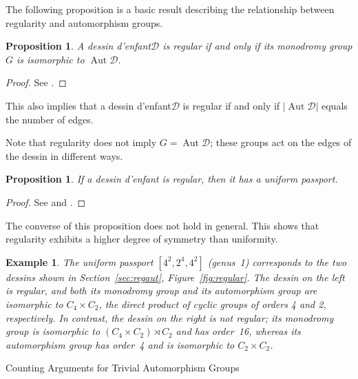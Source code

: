 \documentclass[12pt,reqno]{amsart}
\makeatletter
\newif\if@noindentafterheading
\renewcommand\section{\@startsection{section}{1}{\z@}%
  {-3.5ex \@plus -1ex \@minus -.2ex}%
  {2.6ex \@plus .2ex}%
  {\normalfont\large\bfseries}%
}
\let\orig@section\section
\renewcommand\section{%
  \@ifstar{\section@star}{\section@nostar}%
}
\newcommand\section@nostar{%
  \@ifnextchar[{\section@opt}{\section@noopt}%
}
\newcommand\section@opt[2][]{%
  \global\@noindentafterheadingtrue
  \orig@section[#1]{#2}%
  \global\@noindentafterheadingfalse
}
\newcommand\section@noopt[1]{%
  \global\@noindentafterheadingtrue
  \orig@section{#1}%
  \global\@noindentafterheadingfalse
}
\newcommand\section@star[1]{%
  \global\@noindentafterheadingtrue
  \orig@section*{#1}%
  \global\@noindentafterheadingfalse
}
\newcommand{\msD}{\mathscr{D}}
\DeclareMathOperator{\Aut}{Aut}							%
\theoremstyle{mythmstyle}
\newtheorem{prop}[lemma]{Proposition}
\theoremstyle{mydefstyle}
\newtheorem{exa}[lemma]{Example}
\newcommand{\figref}[1]{Figure~\ref{#1}}
\newcommand{\dde}{dessin d'enfant\xspace}
\newcommand{\AD}{\Aut{\msD}}
\numberwithin{equation}{section}
\makeatother
\begin{document}
The following proposition is a basic result describing the relationship between regularity and automorphism groups.

\begin{prop}
\label{prop:regaut}
A \dde $\msD$ is regular if and only if its monodromy group $G$ is isomorphic to $\AD$.
\end{prop}

\begin{proof}
See \cite[Theorem~2.1]{Jones16}.
\end{proof}

This also implies that a \dde $\msD$ is regular if and only if $\lvert \AD \rvert$ equals the number of edges.

Note that regularity does not imply $G = \Aut \msD$;
these groups act on the edges of the dessin in different ways.

\begin{prop}
\label{prop:reguni}
If a \dde is regular, then it has a uniform passport.
\end{prop}

\begin{proof}
See \cite[Proposition~4.42]{Girondo12} and \cite[Proposition~2.10]{Ohnishi26}.
\end{proof}

The converse of this proposition does not hold in general.
This shows that regularity exhibits a higher degree of symmetry than uniformity.

\begin{exa}
The uniform passport $[4^{2}, 2^{4}, 4^{2}]$ (genus~1) corresponds to the two dessins shown in
Section~\ref{sec:regaut}, \figref{fig:regular}.
The dessin on the left is regular, and both its monodromy group and its automorphism group are
isomorphic to $C_{4} \times C_{2}$, the direct product of cyclic groups of orders 4 and 2, respectively.
In contrast, the dessin on the right is not regular; its monodromy group is isomorphic to $(C_{4} \times C_{2}) \rtimes C_{2}$
and has order~16, whereas its automorphism group has order~4 and is isomorphic to $C_{2} \times C_{2}$.
\end{exa}

\section{Counting Arguments for Trivial Automorphism Groups}
\label{sec:estimation}
\end{document}
